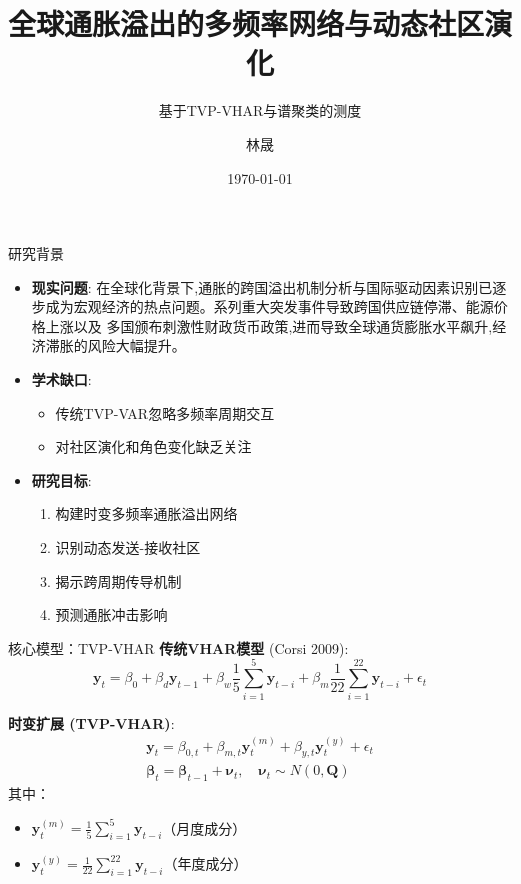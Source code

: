 \documentclass{beamer}
\title{全球通胀溢出的多频率网络与动态社区演化}
\subtitle{基于TVP-VHAR与谱聚类的测度}
\author{林晟}
\institute{统计学院}
\date{\today}
\begin{document}
\frame{\titlepage}

\begin{frame}{研究背景}
\begin{itemize}
\item \textbf{现实问题}: 在全球化背景下,通胀的跨国溢出机制分析与国际驱动因素识别已逐步成为宏观经济的热点问题。系列重大突发事件导致跨国供应链停滞、能源价格上涨以及 多国颁布刺激性财政货币政策,进而导致全球通货膨胀水平飙升,经济滞胀的风险大幅提升。
\item \textbf{学术缺口}: 
  \begin{itemize}
  \item 传统TVP-VAR忽略多频率周期交互
  \item 对社区演化和角色变化缺乏关注
  \end{itemize}
\item \textbf{研究目标}: 
  \begin{enumerate}
  \item 构建时变多频率通胀溢出网络
  \item 识别动态发送-接收社区
  \item 揭示跨周期传导机制
  \item 预测通胀冲击影响
  \end{enumerate}
\end{itemize}
\end{frame}


\begin{frame}{核心模型：TVP-VHAR}
\textbf{传统VHAR模型} (Corsi 2009):
\begin{equation*}
\boldsymbol{y}_t = \beta_0 + \beta_d \boldsymbol{y}_{t-1} + \beta_w \frac{1}{5}\sum_{i=1}^5 \boldsymbol{y}_{t-i} + \beta_m \frac{1}{22}\sum_{i=1}^{22} \boldsymbol{y}_{t-i} + \epsilon_t
\end{equation*}

\textbf{时变扩展 (TVP-VHAR)}:
\begin{gather*}
\boldsymbol{y}_t = \beta_{0,t}  + \beta_{m,t} \boldsymbol{y}_{t}^{(m)} + \beta_{y,t} \boldsymbol{y}_{t}^{(y)} + \epsilon_t \\
\boldsymbol{\beta}_t = \boldsymbol{\beta}_{t-1} + \boldsymbol{\nu}_t, \quad \boldsymbol{\nu}_t \sim N(0,\boldsymbol{Q})
\end{gather*}
其中：
\begin{itemize}
\item $\boldsymbol{y}_{t}^{(m)} = \frac{1}{5}\sum_{i=1}^5 \boldsymbol{y}_{t-i}$（月度成分）
\item $\boldsymbol{y}_{t}^{(y)} = \frac{1}{22}\sum_{i=1}^{22} \boldsymbol{y}_{t-i}$（年度成分）
\end{itemize}
\end{frame}
\end{document}
